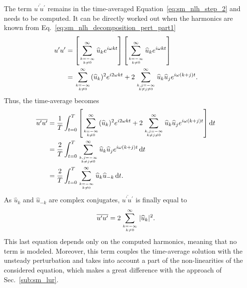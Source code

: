 The term $\overline{u^\prime u^\prime}$ remains in the time-averaged
Equation~\eqref{eq:sm_nlh_step_2}
and needs to be computed. It can be 
directly worked out when the harmonics are known 
from Eq.~\eqref{eq:sm_nlh_decomposition_pert_part1}
\begin{equation}
	\begin{split}
		u^\prime u^\prime &= 
		\left[
			\sum_{\genfrac{}{}{0pt}{}{k=-\infty}{k \neq 0}}^{\infty} \widehat{u}_k e^{i \omega k t} 
		\right]
		\left[
			\sum_{\genfrac{}{}{0pt}{}{k=-\infty}{k \neq 0}}^{\infty} \widehat{u}_k e^{i \omega k t} 
		\right] \\
		&= \sum_{\genfrac{}{}{0pt}{}{k=-\infty}{k \neq 0}}^{\infty} (\widehat{u}_k)^2
		   e^{i 2 \omega k t} +
		   2 \sum_{\genfrac{}{}{0pt}{}{k,j=-\infty}{k \neq j \neq 0}}^{\infty} 
		   \widehat{u}_k \widehat{u}_j e^{i \omega (k + j) t}.
	\end{split}
\end{equation}
Thus, the time-average becomes
\begin{equation}
	\begin{split}
		\overline{u^\prime u^\prime} &= 
		\frac{1}{T} \int_{t=0}^{T} \left[ 
			\sum_{\genfrac{}{}{0pt}{}{k=-\infty}{k \neq 0}}^{\infty} (\widehat{u}_k)^2
		   	e^{i 2 \omega k t} +
		   	2 \sum_{\genfrac{}{}{0pt}{}{k,j=-\infty}{k \neq j \neq 0}}^{\infty} 
		   	\widehat{u}_k \widehat{u}_j e^{i \omega (k + j) t} 
		\right] \diff t\\
		&= \frac{2}{T} \int_{t=0}^{T} \sum_{\genfrac{}{}{0pt}{}{k,j=-\infty}{k \neq j \neq 0}}^{\infty} 
		   	\widehat{u}_k \widehat{u}_j 
		   	e^{i \omega (k + j) t} \diff t \\
		&= \frac{2}{T} \int_{t=0}^{T} 
			\sum_{\genfrac{}{}{0pt}{}{k=-\infty}{k \neq 0}}^{\infty} 
			\widehat{u}_k \widehat{u}_{-k}  \diff t.
	\end{split}
\end{equation}
As $\widehat{u}_k$ and $\widehat{u}_{-k}$ are complex conjugates,
$\overline{u^\prime u^\prime}$ is finally equal to
\begin{equation}
	\overline{u^\prime u^\prime} = 
	2 \sum_{\genfrac{}{}{0pt}{}{k=-\infty}{k \neq 0}}^{\infty} |\widehat{u}_k|^2.
	\label{eq:sm_nlh_deterministic_stress_terms}
\end{equation}
This last equation depends only on the computed harmonics, meaning
that no term is modeled. Moreover, this term couples the
time-average solution with the unsteady perturbation
and takes into account a part of the 
non-linearities of the considered equation, which makes a
great difference with the approach of Sec.~\ref{sub:sm_lur}.


